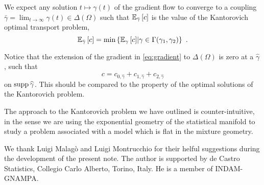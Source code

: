 \documentclass[runningheads]{llncs}
\begin{document}
\begin{remark} We expect any solution $t \mapsto \gamma(t)$ of the gradient flow to converge to a coupling $\bar\gamma = \lim_{t \to \infty} \gamma(t) \in \Delta(\Omega)$ such that ${\operatorname{\mathbb E}}_{\bar\gamma}\left[c\right]$ is the value of the Kantorovich optimal transport problem,
%
\begin{equation*}
  {\operatorname{\mathbb E}}_{\bar\gamma}\left[c\right] = \min \left\{ {\operatorname{\mathbb E}}_{\gamma}\left[c\right] \middle|  \gamma \in \Gamma(\gamma_1,\gamma_2) \right\} \ .
\end{equation*}

Notice that the extension of the gradient in \cref{eq:gradient} to $\Delta(\Omega)$ is zero at a $\widehat\gamma$, such that
%
\begin{equation*}
  c = c_{0,\widehat \gamma} + c_{1,\widehat \gamma} + c_{2,\widehat\gamma}
\end{equation*}
%
on $\operatorname{supp}{\widehat\gamma}$. This should be compared to the property of the optimal solutions of the Kantorovich problem.

The approach to the Kantorovich problem we have outlined is counter-intuitive, in the sense we are using the exponential geometry of the statistical manifold to study a problem associated with a model which is flat in the mixture geometry.
\end{remark}

\begin{remark}[Acknowledgments]
We thank Luigi Malag\`o and Luigi Montrucchio for their helful suggestions during the development of the present note. The author is supported by de Castro Statistics, Collegio Carlo Alberto, Torino, Italy. He is a member of INDAM-GNAMPA.   
\end{remark}



\end{document}
